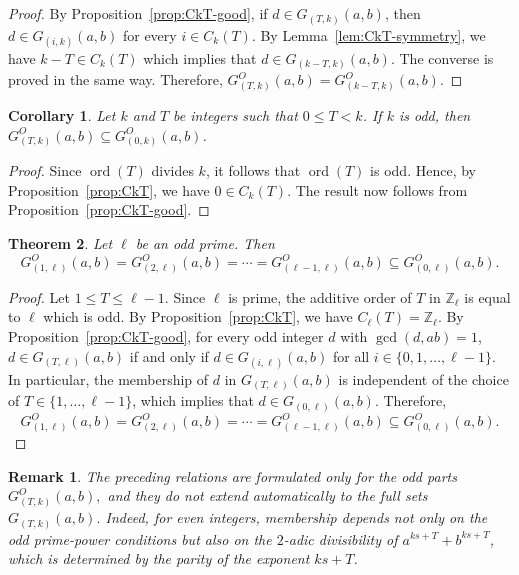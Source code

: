 \documentclass[pdflatex,sn-mathphys-num]{sn-jnl}%
\theoremstyle{thmstyleone}%
\newtheorem{theorem}{Theorem}%
\newtheorem{corollary}[theorem]{Corollary}%
\theoremstyle{thmstyletwo}%
\newtheorem{remark}{Remark}%
\theoremstyle{thmstylethree}%
\newcommand{\Z}{\mathbb{Z}}
\newcommand{\ord}{\operatorname{ord}}
\begin{document}
\begin{proof} 
By Proposition~\ref{prop:CkT-good}, if
$
d\in G_{(T,k)}(a,b)$,
then
$
d\in G_{(i,k)}(a,b)$
for every $ i\in C_k(T)$.
By Lemma~\ref{lem:CkT-symmetry},  we have  $k-T\in C_k(T)$ which  implies  that $
d\in G_{(k-T,k)}(a,b)$.
The converse is proved in the same way.
Therefore, $
G^O_{(T,k)}(a,b)=G^O_{(k-T,k)}(a,b)$.
\end{proof}

\begin{corollary}\label{cor:k-odd-type0-good} Let $k$ and $T$ be   integers  such that $0\le T<k$.
If  $k$ is odd, then
$
G^O_{(T,k)}(a,b)\subseteq G^O_{(0,k)}(a,b)$.
\end{corollary}

\begin{proof}
Since $\ord(T)$ divides $k$, it follows that $\ord(T)$ is odd. Hence, by Proposition~\ref{prop:CkT}, we have  $
0\in C_k(T)$.
The result now follows from Proposition~\ref{prop:CkT-good}.
\end{proof}

\begin{theorem}\label{thm:prime-k-relations}
Let $\ell$ be an odd prime. Then
\[
G^O_{(1,\ell)}(a,b)=G^O_{(2,\ell)}(a,b)=\cdots=G^O_{(\ell-1,\ell)}(a,b)\subseteq G^O_{(0,\ell)}(a,b).
\]
\end{theorem}

\begin{proof}
Let $1\le T\le \ell-1$. Since $\ell$ is prime, the additive order of $T$ in $\Z_\ell$ is equal to $\ell$ which is odd. By Proposition~\ref{prop:CkT},   we have  $
C_\ell(T)=\Z_\ell$.
By Proposition~\ref{prop:CkT-good}, for every odd integer $d$ with $\gcd(d,ab)=1$,
$
d\in G_{(T,\ell)}(a,b)
$ if and only if $
d\in G_{(i,\ell)}(a,b)$  for all $i\in\{0,1,\dots,\ell-1\}$.
In particular, the membership of $d$ in $G_{(T,\ell)}(a,b)$ is independent of the choice of
$
T\in\{1,\dots,\ell-1\}$,
which implies that
$
d\in G_{(0,\ell)}(a,b)$.
Therefore, 
\[
G^O_{(1,\ell)}(a,b)=G^O_{(2,\ell)}(a,b)=\cdots=G^O_{(\ell-1,\ell)}(a,b)\subseteq G^O_{(0,\ell)}(a,b).
\]
\end{proof}

\begin{remark}
The preceding relations are formulated only for the odd parts
$
G^O_{(T,k)}(a,b),
$
and they do not extend automatically to the full sets $G_{(T,k)}(a,b)$. Indeed, for even integers, membership depends not only on the odd prime-power conditions but also on the $2$-adic divisibility of
$
a^{ks+T}+b^{ks+T}$,
which is determined by the parity of the exponent $ks+T$.
\end{remark}
\end{document}
